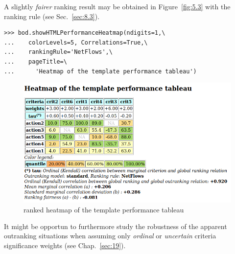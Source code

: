 A slightly \emph{fairer} ranking result may be obtained in Figure~\vref{fig:5.3} with the \NetFlows ranking rule (see Sec.~\ref{sec:8.3}).
\begin{lstlisting}
>>> bod.showHTMLPerformanceHeatmap(ndigits=1,\
...    colorLevels=5, Correlations=True,\
...    rankingRule='NetFlows',\
...    pageTitle=\
...      'Heatmap of the template performance tableau')
\end{lstlisting}
\begin{figure}[ht]
\includegraphics[width=\hsize]{Figures/5-3-templateHeatmapNF.png}
\caption{\NetFlows ranked heatmap of the template performance tableau}
\label{fig:5.3}       %
\end{figure}

It might be opportun to furthermore study the robustness of the apparent outranking situations when assuming only \emph{ordinal} or \emph{uncertain} criteria significance weights (see Chap.~\ref{sec:19}). 
 
%


